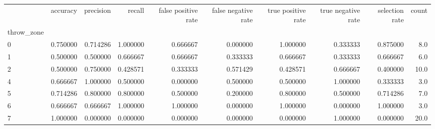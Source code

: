 \begin{tabular}{lrrrrrrrrr}
\toprule
{} &  accuracy &  precision &    recall &  false positive rate &  false negative rate &  true positive rate &  true negative rate &  selection rate &  count \\
throw\_zone &           &            &           &                      &                      &                     &                     &                 &        \\
\midrule
0          &  0.750000 &   0.714286 &  1.000000 &             0.666667 &             0.000000 &            1.000000 &            0.333333 &        0.875000 &    8.0 \\
1          &  0.500000 &   0.500000 &  0.666667 &             0.666667 &             0.333333 &            0.666667 &            0.333333 &        0.666667 &    6.0 \\
2          &  0.500000 &   0.750000 &  0.428571 &             0.333333 &             0.571429 &            0.428571 &            0.666667 &        0.400000 &   10.0 \\
4          &  0.666667 &   1.000000 &  0.500000 &             0.000000 &             0.500000 &            0.500000 &            1.000000 &        0.333333 &    3.0 \\
5          &  0.714286 &   0.800000 &  0.800000 &             0.500000 &             0.200000 &            0.800000 &            0.500000 &        0.714286 &    7.0 \\
6          &  0.666667 &   0.666667 &  1.000000 &             1.000000 &             0.000000 &            1.000000 &            0.000000 &        1.000000 &    3.0 \\
7          &  1.000000 &   0.000000 &  0.000000 &             0.000000 &             0.000000 &            0.000000 &            1.000000 &        0.000000 &   20.0 \\
\bottomrule
\end{tabular}
